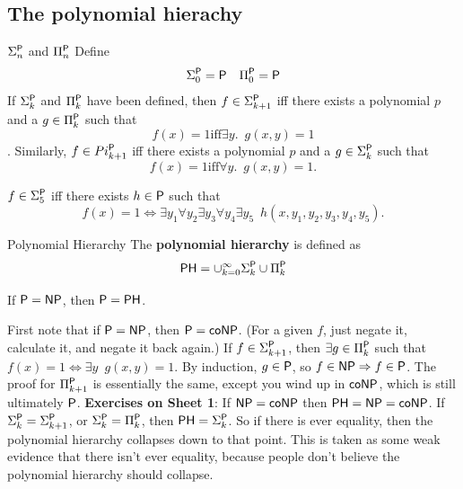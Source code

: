 \documentclass{article}
\begin{document}
\subsection{The polynomial hierachy}
\begin{fancydefine}{$\Sigma_{n}^{\mathsf{P}}$ and $\Pi_{n}^{\mathsf{P}}$}
    Define \begin{align*}
        \Sigma_{0}^{\mathsf{P}} = \mathsf{P} & & \Pi_{0}^{\mathsf{P}} = \mathsf{P}
    \end{align*}
    If $\Sigma_{k}^{\mathsf{P}}$ and $\Pi_{k}^{\mathsf{P}}$ have been defined, then $f \in \Sigma_{k+1}^{\mathsf{P}}$ iff there exists a polynomial $p$ and a $g \in \Pi_{k}^{\mathsf{P}}$ such that \[f(x)=1 \text{iff} \exists y. \,\,\, g(x,y)=1\]. Similarly, $f \in Pi_{k+1}^{\mathsf{P}}$ iff there exists a polynomial $p$ and a $g \in \Sigma_{k}^{\mathsf{P}}$ such that \[f(x) = 1
     \text{iff} \forall y. \,\,\, g(x,y)=1.\]
\end{fancydefine}
\begin{ex}
    $f \in \Sigma_{5}^{\mathsf{P}}$ iff there exists $h \in \mathsf{P}$ such that \[ f(x)=1 \Leftrightarrow \exists y_{1} \forall y_{2} \exists y_{3} \forall y_{4} \exists y_{5} \,\,\, h(x,y_{1},y_{2},y_{3},y_{4},y_{5}).\]
\end{ex}
\begin{fancydefine}{Polynomial Hierarchy}
    The \textbf{polynomial hierarchy} is defined as \[ \mathsf{PH} = \cup_{k=0}^{\infty} \Sigma_{k}^{\mathsf{P}} \cup \Pi_{k}^{\mathsf{P}}\]
\end{fancydefine}
\begin{fancyprop}{}
    If $\mathsf{P} = \mathsf{NP}$, then $\mathsf{P} = \mathsf{PH}$.
\end{fancyprop}
\proof First note that if $\mathsf{P} = \mathsf{NP}$, then $\mathsf{P} = \mathsf{coNP}$. (For a given $f$, just negate it, calculate it, and negate it back again.) \gap 
If $f \in \Sigma_{k+1}^{\mathsf{P}}$, then $\exists g \in \Pi_{k}^{\mathsf{P}}$ such that $f(x)=1 \Leftrightarrow \exists y \,\,\, g(x,y)=1$. By induction, $g \in \mathsf{P}$, so $f \in \mathsf{NP} \Rightarrow f \in \mathsf{P}$. The proof for $\Pi_{k+1}^{\mathsf{P}}$ is essentially the same, except you wind up in $\mathsf{coNP}$, which is still ultimately $\mathsf{P}$.
\endproof
\textbf{Exercises on Sheet 1}: If $\mathsf{NP} = \mathsf{coNP}$ then $\mathsf{PH} = \mathsf{NP} = \mathsf{coNP}$. If $\Sigma_{k}^{\mathsf{P}} = \Sigma_{k+1}^{\mathsf{P}}$, or $\Sigma_{k}^{\mathsf{P}} = \Pi_{k}^{\mathsf{P}}$, then $\mathsf{PH} = \Sigma_{k}^{\mathsf{P}}$. So if there is ever equality, then the polynomial hierarchy collapses down to that point. This is taken as some weak evidence that there isn't ever equality, because people don't believe the polynomial hierarchy should collapse.
\end{document}
